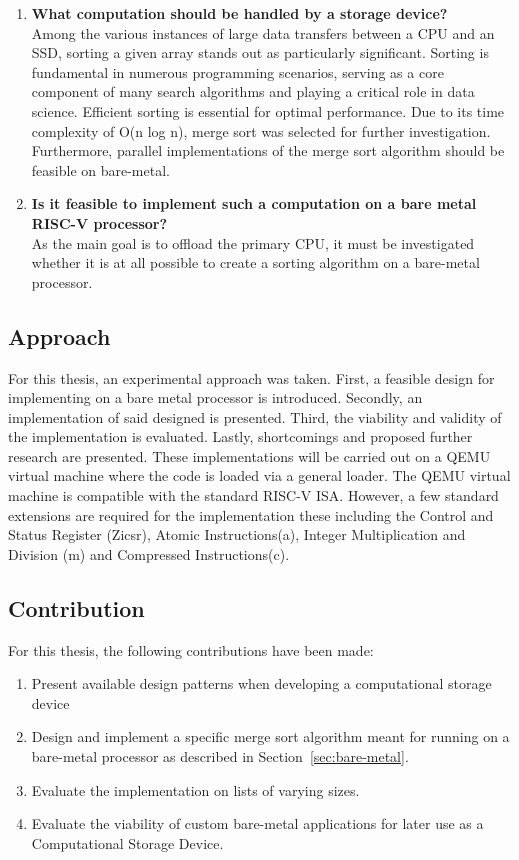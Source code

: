 \begin{enumerate}
  \item {\large \textbf{What computation should be handled by a storage
    device?}}\label{sec:computational} \\
    Among the various instances of large data transfers between a CPU and an SSD,
    sorting a given array stands out as particularly significant. Sorting is
    fundamental in numerous programming scenarios, serving as a core component of
    many search algorithms and playing a critical role in data science. Efficient
    sorting is essential for optimal performance. Due to its time complexity of O(n
    log n), merge sort was selected for further investigation. Furthermore, parallel
    implementations of the merge sort algorithm should be feasible on
    bare-metal.
  \item {\large \textbf{ Is it feasible to implement such a computation on a
    bare metal RISC-V processor?}} \\
    As the main goal is to offload the primary CPU, it must be investigated
    whether it is at all possible to create a sorting algorithm on a bare-metal
    processor.
\end{enumerate}


\subsection{Approach}\label{sec:approach}
For this thesis, an experimental approach was taken. First, a feasible design
for implementing on a bare metal processor is introduced. Secondly, an
implementation of said designed is presented. Third, the viability and validity
of the implementation is evaluated. Lastly, shortcomings and proposed further
research are presented. These implementations will be carried out on a QEMU
virtual machine where the code is loaded via a general loader. The QEMU virtual
machine is compatible with the standard RISC-V ISA. However, a few standard
extensions are required for the implementation these including the Control and
Status Register (Zicsr), Atomic Instructions(a), Integer Multiplication and
Division (m) and Compressed Instructions(c).

\subsection{Contribution}
For this thesis, the following contributions have been made:
\begin{enumerate}
  \item Present available design patterns when developing a computational
    storage device
  \item Design and implement a specific merge sort algorithm meant for running on a
    bare-metal processor as described in Section~\ref{sec:bare-metal}.
  \item Evaluate the implementation on lists of varying sizes.
  \item Evaluate the viability of custom bare-metal applications for later use
    as a Computational Storage Device.
\end{enumerate}


